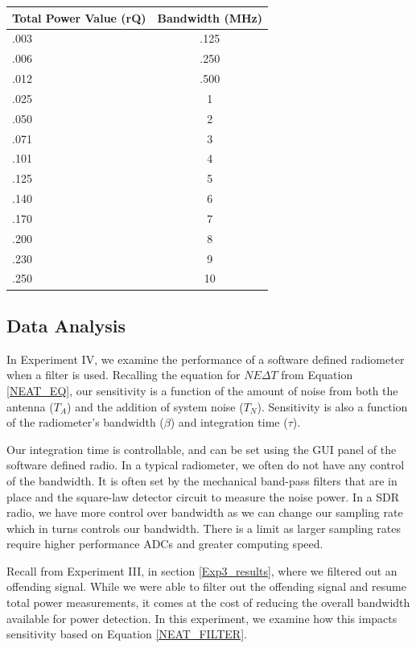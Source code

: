 \begin{table}[h!tb] \centering
{}
\label{exp4_datapoints}
\begin{tabular}{lc} \hline
\textbf{Total Power Value (rQ)} & \textbf{Bandwidth (MHz)} \\ \hline
.003 & .125 \\
.006 & .250 \\
.012 & .500 \\
.025 & 1 \\
.050 & 2 \\
.071 & 3 \\
.101 & 4 \\
.125 & 5 \\
.140 & 6 \\
.170 & 7 \\
.200 & 8 \\
.230 & 9 \\
.250 & 10 \\ \hline
\end{tabular}
\end{table}

\subsection{Data Analysis}

In Experiment IV, we examine the performance of a software defined radiometer when a filter is used.  Recalling the equation for $NE\Delta T$ from Equation \ref{NEAT_EQ}, our sensitivity is a function of the amount of noise from both the antenna ($T_{A}$) and the addition of system noise ($T_{N}$).  Sensitivity is also a function of the radiometer's bandwidth ($\beta$) and integration time ($\tau$).

Our integration time is controllable, and can be set using the GUI panel of the software defined radio.  In a typical radiometer, we often do not have any control of the bandwidth.  It is often set by the mechanical band-pass filters that are in place and the square-law detector circuit to measure the noise power.  In a SDR radio, we have more control over bandwidth as we can change our sampling rate which in turns controls our bandwidth.  There is a limit as larger sampling rates require higher performance ADCs and greater computing speed.

Recall from Experiment III, in section \ref{Exp3_results}, where we filtered out an offending signal.  While we were able to filter out the offending signal and resume total power measurements, it comes at the cost of reducing the overall bandwidth available for power detection.  In this experiment, we examine how this impacts sensitivity based on Equation \ref{NEAT_FILTER}.

